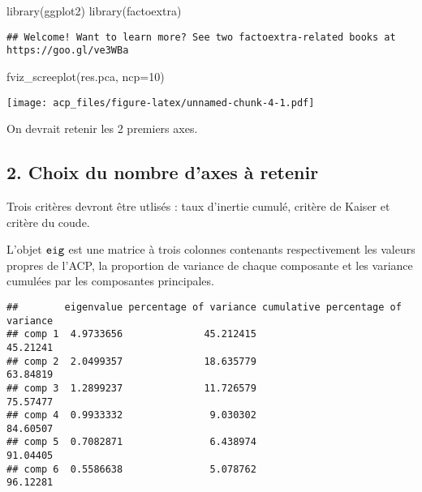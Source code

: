 \documentclass[
]{article}
\newenvironment{Shaded}{\begin{snugshade}}{\end{snugshade}}
\newcommand{\AttributeTok}[1]{\textcolor[rgb]{0.77,0.63,0.00}{#1}}
\newcommand{\DecValTok}[1]{\textcolor[rgb]{0.00,0.00,0.81}{#1}}
\newcommand{\FunctionTok}[1]{\textcolor[rgb]{0.00,0.00,0.00}{#1}}
\newcommand{\NormalTok}[1]{#1}
\newcommand{\SpecialCharTok}[1]{\textcolor[rgb]{0.00,0.00,0.00}{#1}}
\begin{document}
\begin{Shaded}
\begin{Highlighting}[]
\FunctionTok{library}\NormalTok{(ggplot2)}
\FunctionTok{library}\NormalTok{(factoextra)}
\end{Highlighting}
\end{Shaded}

\begin{verbatim}
## Welcome! Want to learn more? See two factoextra-related books at https://goo.gl/ve3WBa
\end{verbatim}

\begin{Shaded}
\begin{Highlighting}[]
\FunctionTok{fviz\_screeplot}\NormalTok{(res.pca, }\AttributeTok{ncp=}\DecValTok{10}\NormalTok{)}
\end{Highlighting}
\end{Shaded}

\texttt{[image: acp\_files/figure-latex/unnamed-chunk-4-1.pdf]}

On devrait retenir les 2 premiers axes.

\hypertarget{choix-du-nombre-daxes-uxe0-retenir}{%
\subsection{2. Choix du nombre d'axes à
retenir}\label{choix-du-nombre-daxes-uxe0-retenir}}

Trois critères devront être utlisés : taux d'inertie cumulé, critère de
Kaiser et critère du coude.

L'objet \(\tt eig\) est une matrice à trois colonnes contenants
respectivement les valeurs propres de l'ACP, la proportion de variance
de chaque composante et les variance cumulées par les composantes
principales.

\begin{Shaded}
\end{Shaded}

\begin{verbatim}
##        eigenvalue percentage of variance cumulative percentage of variance
## comp 1  4.9733656              45.212415                          45.21241
## comp 2  2.0499357              18.635779                          63.84819
## comp 3  1.2899237              11.726579                          75.57477
## comp 4  0.9933332               9.030302                          84.60507
## comp 5  0.7082871               6.438974                          91.04405
## comp 6  0.5586638               5.078762                          96.12281
\end{verbatim}
\end{document}
